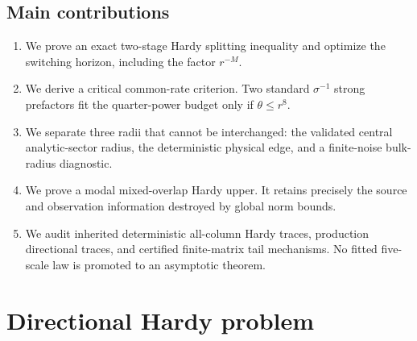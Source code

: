 \documentclass[11pt]{article}
\theoremstyle{remark}
\begin{document}
\subsection*{Main contributions}

\begin{enumerate}[leftmargin=2.2em]
 \item We prove an exact two-stage Hardy splitting inequality and optimize
       the switching horizon, including the factor $r^{-M}$.
 \item We derive a critical common-rate criterion.  Two standard
       $\sigma^{-1}$ strong prefactors fit the quarter-power budget only if
       $\theta\le r^8$.
 \item We separate three radii that cannot be interchanged: the validated
       central analytic-sector radius, the deterministic physical edge, and
       a finite-noise bulk-radius diagnostic.
 \item We prove a modal mixed-overlap Hardy upper.  It retains precisely the
       source and observation information destroyed by global norm bounds.
 \item We audit inherited deterministic all-column Hardy traces, production
       directional traces, and certified finite-matrix tail mechanisms.  No
       fitted five-scale law is promoted to an asymptotic theorem.
\end{enumerate}

\section{Directional Hardy problem}
\end{document}
